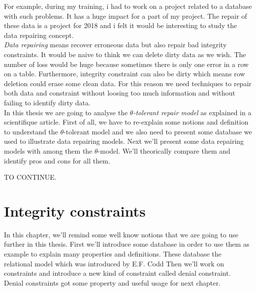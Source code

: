 \documentclass[letterpaper, 12pt]{report}
\newcommand{\alinea}{
\hspace*{0.5cm}}
\begin{document}
For example, during my training, i had to work on a project related to a database with such problems. It has a huge impact for a part of my project. The repair of these data is a project for 2018 and i felt it would be interesting to study the data repairing concept.\\

\emph{Data repairing} means recover erroneous data but also repair bad integrity constraints. It would be naive to think we can delete dirty data as we wish. The number of loss would be huge because sometimes there is only one error in a row on a table. Furthermore, integrity constraint can also be dirty which means row deletion could erase some clean data. For this reason we need techniques to repair both data and  constraint  without loosing too much information and without failing to identify dirty data. \\

In this thesis we are going to analyse the \emph{$\theta$-tolerant repair model} as explained in a scientifique article\cite{main}. First of all, we have to re-explain some notions and definition to understand the $\theta$-tolerant model and we also need to present some database we used to illustrate data repairing models. Next we'll present some data repairing models with among them the $\theta$-model. We'll theorically compare them and identify pros and cons for all them.

TO CONTINUE.

\chapter{Integrity constraints}


\alinea In this chapter, we'll remind some well know notions that we are going to use further in this thesis. First we'll introduce some database in order to use them as example to explain many properties and definitions. These database  the relational model which was introduced by E.F. Codd \cite{misc1} Then we'll work on constraints and introduce a new kind of constraint called denial constraint. Denial constraints got some property and useful usage for next chapter.
\end{document}

